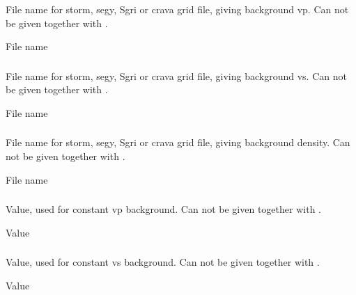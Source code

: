 \subsubsection{}
 \slist
   \item \Description File name for storm, segy, Sgri or crava grid file, giving background vp. Can not be given together with .
   \item \Argument File name
   \item \Default
 \elist

\subsubsection{}
 \slist
   \item \Description File name for storm, segy, Sgri or crava grid file, giving background vs. Can not be given together with .
   \item \Argument File name
   \item \Default
 \elist

\subsubsection{}
 \slist
   \item \Description File name for storm, segy, Sgri or crava grid file, giving background density. Can not be given together with .
   \item \Argument File name
   \item \Default
 \elist

\subsubsection{}
 \slist
   \item \Description Value, used for constant vp background. Can not be given together with .
   \item \Argument Value
   \item \Default
 \elist

\subsubsection{}
 \slist
   \item \Description Value, used for constant vs background. Can not be given together with .
   \item \Argument Value
   \item \Default
 \elist

